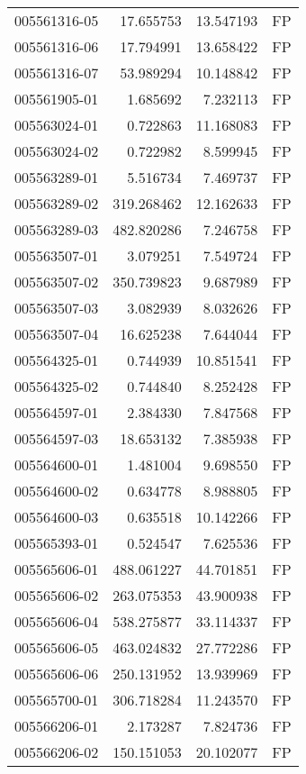 \begin{tabular}{lrrl}
005561316-05 &   17.655753 &    13.547193 &   FP \\
005561316-06 &   17.794991 &    13.658422 &   FP \\
005561316-07 &   53.989294 &    10.148842 &   FP \\
005561905-01 &    1.685692 &     7.232113 &   FP \\
005563024-01 &    0.722863 &    11.168083 &   FP \\
005563024-02 &    0.722982 &     8.599945 &   FP \\
005563289-01 &    5.516734 &     7.469737 &   FP \\
005563289-02 &  319.268462 &    12.162633 &   FP \\
005563289-03 &  482.820286 &     7.246758 &   FP \\
005563507-01 &    3.079251 &     7.549724 &   FP \\
005563507-02 &  350.739823 &     9.687989 &   FP \\
005563507-03 &    3.082939 &     8.032626 &   FP \\
005563507-04 &   16.625238 &     7.644044 &   FP \\
005564325-01 &    0.744939 &    10.851541 &   FP \\
005564325-02 &    0.744840 &     8.252428 &   FP \\
005564597-01 &    2.384330 &     7.847568 &   FP \\
005564597-03 &   18.653132 &     7.385938 &   FP \\
005564600-01 &    1.481004 &     9.698550 &   FP \\
005564600-02 &    0.634778 &     8.988805 &   FP \\
005564600-03 &    0.635518 &    10.142266 &   FP \\
005565393-01 &    0.524547 &     7.625536 &   FP \\
005565606-01 &  488.061227 &    44.701851 &   FP \\
005565606-02 &  263.075353 &    43.900938 &   FP \\
005565606-04 &  538.275877 &    33.114337 &   FP \\
005565606-05 &  463.024832 &    27.772286 &   FP \\
005565606-06 &  250.131952 &    13.939969 &   FP \\
005565700-01 &  306.718284 &    11.243570 &   FP \\
005566206-01 &    2.173287 &     7.824736 &   FP \\
005566206-02 &  150.151053 &    20.102077 &   FP \\

\end{tabular}
